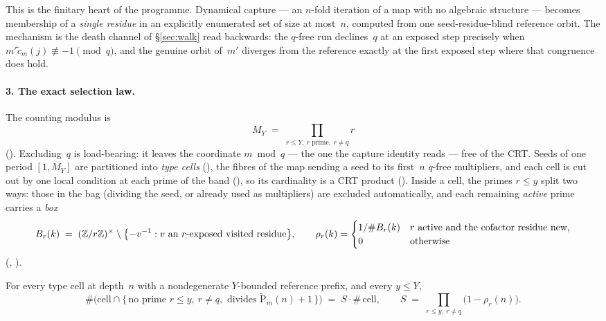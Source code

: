 This is the finitary heart of the programme.  Dynamical capture --- an
$n$-fold iteration of a map with no algebraic structure --- becomes
membership of a \emph{single residue} in an explicitly enumerated set of
size at most~$n$, computed from one seed-residue-blind reference orbit.
The mechanism is the death channel of \S\ref{sec:walk} read
backwards: the $q$-free run declines~$q$ at an exposed step precisely when
$m'\tilde c_m(j) \not\equiv -1 \pmod q$, and the genuine orbit of~$m'$
diverges from the reference exactly at the first exposed step where that
congruence does hold.

\paragraph{3.  The exact selection law.}
The counting modulus is
\[
  M_Y \;=\; \prod_{r \leq Y,\ r \text{ prime},\ r \neq q} r
\]
().  Excluding~$q$ is
load-bearing: it leaves the coordinate $m \bmod q$ --- the one the capture
identity reads --- free of the CRT.  Seeds of one period $[1,M_Y]$ are
partitioned into \emph{type cells}
(), the fibres of the map
sending a seed to its first~$n$ $q$-free multipliers, and each cell is cut
out by one local condition at each prime of the band
(), so its
cardinality is a CRT product
().  Inside a cell,
the primes $r \le y$ split two ways: those in the bag (dividing the seed,
or already used as multipliers) are excluded automatically, and each
remaining \emph{active} prime carries a \emph{box}
\[
  B_r(k) \;=\; (\mathbb{Z}/r\mathbb{Z})^\times \setminus
    \bigl\{-v^{-1} : v \text{ an } r\text{-exposed visited residue}\bigr\},
  \qquad
  \rho_r(k) = \begin{cases}
    1/\#B_r(k) & \text{$r$ active and the cofactor residue new,}\\
    0 & \text{otherwise}
  \end{cases}
\]
(,
).

\begin{theorem}
\label{thm:selection-law}
For every type cell at depth~$n$ with a nondegenerate $Y$-bounded reference
prefix, and every $y \le Y$,
\[
  \#\bigl(\mathrm{cell} \cap \{\,\text{no prime } r \leq y,\ r \neq q,
    \text{ divides } \tilde{\mathrm{P}}_m(n)+1 \,\}\bigr)
  \;=\; S \cdot \#\,\mathrm{cell},
  \qquad
  S \;=\; \prod_{r \leq y,\ r \neq q} \bigl(1 - \rho_r(n)\bigr) .
\]
\end{theorem}

